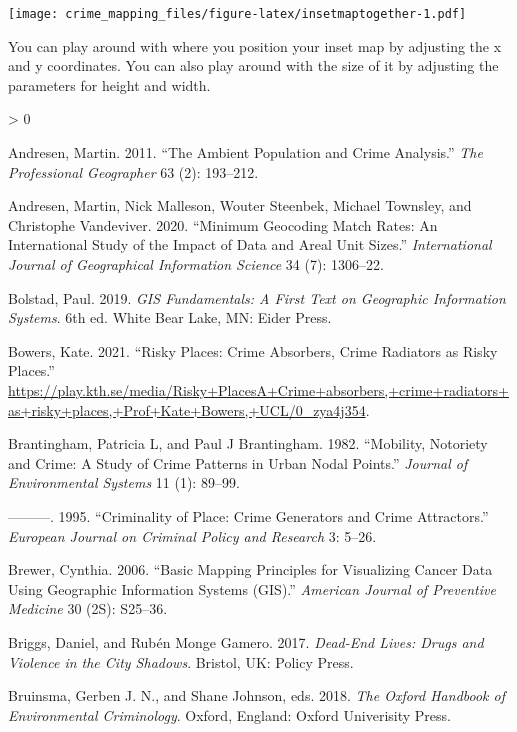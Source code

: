\documentclass[
]{book}
\newlength{\cslhangindent}
\newenvironment{CSLReferences}[2] %
 {%
  \setlength{\parindent}{0pt}
  \ifodd #1 \everypar{\setlength{\hangindent}{\cslhangindent}}\ignorespaces\fi
  \ifnum #2 > 0
  \setlength{\parskip}{#2\baselineskip}
  \fi
 }%
 {}
\begin{document}
\texttt{[image: crime\_mapping\_files/figure-latex/insetmaptogether-1.pdf]}

You can play around with where you position your inset map by adjusting the x and y coordinates. You can also play around with the size of it by adjusting the parameters for height and width.

\hypertarget{refs}{}
\begin{CSLReferences}{1}{0}
\leavevmode\hypertarget{ref-Andresen_2011}{}%
Andresen, Martin. 2011. {``The Ambient Population and Crime Analysis.''} \emph{The Professional Geographer} 63 (2): 193--212.

\leavevmode\hypertarget{ref-Andresen_2020}{}%
Andresen, Martin, Nick Malleson, Wouter Steenbek, Michael Townsley, and Christophe Vandeviver. 2020. {``Minimum Geocoding Match Rates: An International Study of the Impact of Data and Areal Unit Sizes.''} \emph{International Journal of Geographical Information Science} 34 (7): 1306--22.

\leavevmode\hypertarget{ref-Bolstad_2019}{}%
Bolstad, Paul. 2019. \emph{GIS Fundamentals: A First Text on Geographic Information Systems}. 6th ed. White Bear Lake, MN: Eider Press.

\leavevmode\hypertarget{ref-Bowers_2021}{}%
Bowers, Kate. 2021. {``Risky Places: Crime Absorbers, Crime Radiators as Risky Places.''} \url{https://play.kth.se/media/Risky+PlacesA+Crime+absorbers,+crime+radiators+as+risky+places,+Prof+Kate+Bowers,+UCL/0_zya4j354}.

\leavevmode\hypertarget{ref-Brantingham_1982}{}%
Brantingham, Patricia L, and Paul J Brantingham. 1982. {``Mobility, Notoriety and Crime: A Study of Crime Patterns in Urban Nodal Points.''} \emph{Journal of Environmental Systems} 11 (1): 89--99.

\leavevmode\hypertarget{ref-Brantingham_1995}{}%
---------. 1995. {``Criminality of Place: Crime Generators and Crime Attractors.''} \emph{European Journal on Criminal Policy and Research} 3: 5--26.

\leavevmode\hypertarget{ref-Brewer_2006}{}%
Brewer, Cynthia. 2006. {``Basic Mapping Principles for Visualizing Cancer Data Using Geographic Information Systems (GIS).''} \emph{American Journal of Preventive Medicine} 30 (2S): S25--36.

\leavevmode\hypertarget{ref-Briggs_2017}{}%
Briggs, Daniel, and Rubén Monge Gamero. 2017. \emph{Dead-End Lives: Drugs and Violence in the City Shadows}. Bristol, UK: Policy Press.

\leavevmode\hypertarget{ref-Bruinsma_2018}{}%
Bruinsma, Gerben J. N., and Shane Johnson, eds. 2018. \emph{The Oxford Handbook of Environmental Criminology}. Oxford, England: Oxford Univerisity Press.


\end{CSLReferences}
\end{document}
